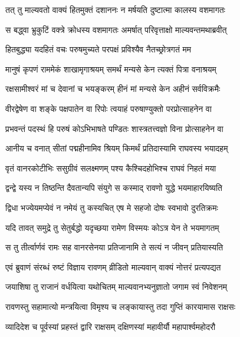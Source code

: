 
\twolineshloka
{तत् तु माल्यवतो वाक्यं हितमुक्तं दशाननः}
{न मर्षयति दुष्टात्मा कालस्य वशमागतः} %

\twolineshloka
{स बद्ध्वा भ्रुकुटिं वक्त्रे क्रोधस्य वशमागतः}
{अमर्षात् परिवृत्ताक्षो माल्यवन्तमथाब्रवीत्} %

\twolineshloka
{हितबुद्ध्या यदहितं वचः परुषमुच्यते}
{परपक्षं प्रविश्यैव नैतच्छ्रोत्रगतं मम} %

\twolineshloka
{मानुषं कृपणं राममेकं शाखामृगाश्रयम्}
{समर्थं मन्यसे केन त्यक्तं पित्रा वनाश्रयम्} %

\twolineshloka
{रक्षसामीश्वरं मां च देवानां च भयङ्करम्}
{हीनं मां मन्यसे केन अहीनं सर्वविक्रमैः} %

\twolineshloka
{वीरद्वेषेण वा शङ्के पक्षपातेन वा रिपोः}
{त्वयाहं परुषाण्युक्तो परप्रोत्साहनेन वा} %

\twolineshloka
{प्रभवन्तं पदस्थं हि परुषं कोऽभिभाषते}
{पण्डितः शास्त्रतत्त्वज्ञो विना प्रोत्साहनेन वा} %

\twolineshloka
{आनीय च वनात् सीतां पद्महीनामिव श्रियम्}
{किमर्थं प्रतिदास्यामि राघवस्य भयादहम्} %

\twolineshloka
{वृतं वानरकोटीभिः ससुग्रीवं सलक्ष्मणम्}
{पश्य कैश्चिदहोभिश्च राघवं निहतं मया} %

\twolineshloka
{द्वन्द्वे यस्य न तिष्ठन्ति दैवतान्यपि संयुगे}
{स कस्माद् रावणो युद्धे भयमाहारयिष्यति} %

\twolineshloka
{द्विधा भज्येयमप्येवं न नमेयं तु कस्यचित्}
{एष मे सहजो दोषः स्वभावो दुरतिक्रमः} %

\twolineshloka
{यदि तावत् समुद्रे तु सेतुर्बद्धो यदृच्छया}
{रामेण विस्मयः कोऽत्र येन ते भयमागतम्} %

\twolineshloka
{स तु तीर्त्वार्णवं रामः सह वानरसेनया}
{प्रतिजानामि ते सत्यं न जीवन् प्रतियास्यति} %

\twolineshloka
{एवं ब्रुवाणं संरब्धं रुष्टं विज्ञाय रावणम्}
{व्रीडितो माल्यवान् वाक्यं नोत्तरं प्रत्यपद्यत} %

\twolineshloka
{जयाशिषा तु राजानं वर्धयित्वा यथोचितम्}
{माल्यवानभ्यनुज्ञातो जगाम स्वं निवेशनम्} %

\twolineshloka
{रावणस्तु सहामात्यो मन्त्रयित्वा विमृश्य च}
{लङ्कायास्तु तदा गुप्तिं कारयामास राक्षसः} %

\twolineshloka
{व्यादिदेश च पूर्वस्यां प्रहस्तं द्वारि राक्षसम्}
{दक्षिणस्यां महावीर्यौ महापार्श्वमहोदरौ} %

